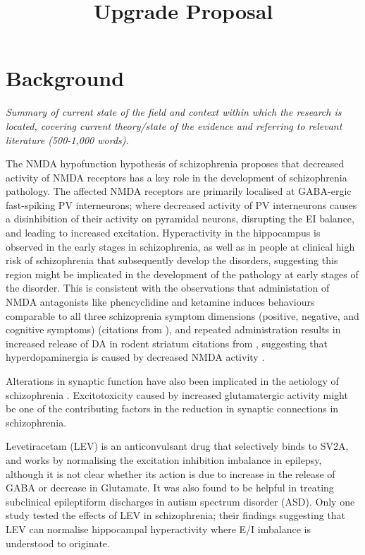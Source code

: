 \documentclass[
  letterpaper,
  DIV=11,
  numbers=noendperiod]{scrartcl}
\title{Upgrade Proposal}
\author{Julia Marcinkowska \and  \and }
\date{}
\begin{document}
\maketitle

\section{Background}\label{background}

\emph{Summary of current state of the field and context within which the
research is located, covering current theory/state of the evidence and
referring to relevant literature (500-1,000 words).}

The {NMDA} hypofunction hypothesis of schizophrenia proposes that
decreased activity of {NMDA} receptors has a key role in the development
of schizophrenia pathology. The affected {NMDA} receptors are primarily
localised at {GABA}-ergic fast-spiking {PV} interneurons; where
decreased activity of {PV} interneurons causes a disinhibition of their
activity on pyramidal neurons, disrupting the {EI} balance, and leading
to increased excitation. Hyperactivity in the hippocampus is observed in
the early stages in schizophrenia, as well as in people at clinical high
risk of schizophrenia that subsequently develop the disorders,
suggesting this region might be implicated in the development of the
pathology at early stages of the disorder. This is consistent with the
observations that administation of {NMDA} antagonists like phencyclidine
and ketamine induces behaviours comparable to all three schizoprenia
symptom dimensions (positive, negative, and cognitive symptoms)
(citations from \autocite{nakazawa_origin_2020}), and repeated
administration results in increased release of {DA} in rodent striatum
citations from \autocite{nakazawa_origin_2020}, suggesting that
hyperdopaminergia is caused by decreased {NMDA} activity
\autocite{grace_dopamine_2012,grace_dysregulation_2016}.

Alterations in synaptic function have also been implicated in the
aetiology of schizophrenia \autocite{howes_synaptic_2023}.
Excitotoxicity caused by increased glutamatergic activity might be one
of the contributing factors in the reduction in synaptic connections in
schizophrenia.

Levetiracetam (LEV) is an anticonvulsant drug that selectively binds to
SV2A, and works by normalising the excitation inhibition imbalance in
epilepsy, although it is not clear whether its action is due to increase
in the release of GABA or decrease in Glutamate. It was also found to be
helpful in treating subclinical epileptiform discharges in autism
spectrum disorder (ASD)\autocite{wang_levetiracetam_2017}. Only one
study tested the effects of LEV in schizophrenia; their findings
suggesting that LEV can normalise hippocampal hyperactivity
\autocite{roeske_modulation_2023} where E/I imbalance is understood to
originate.
\end{document}
